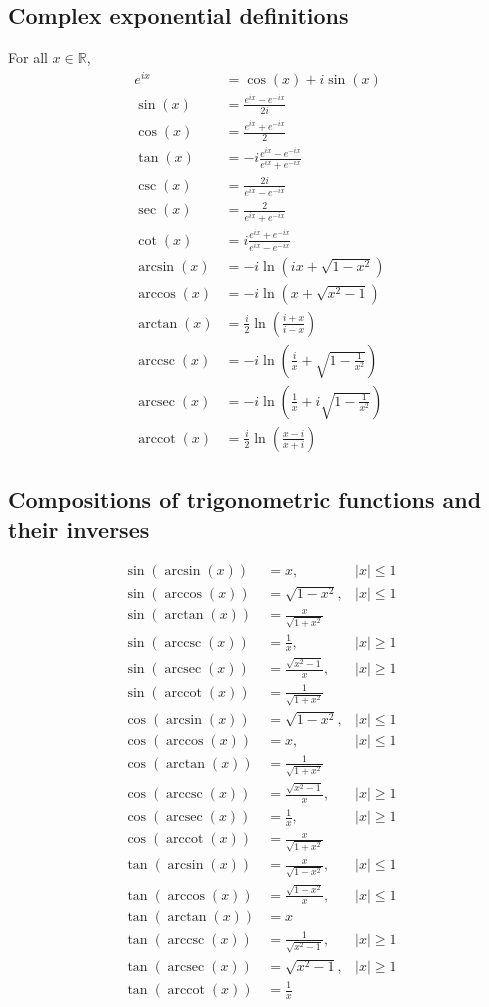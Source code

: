 \documentclass{article}
\DeclareMathOperator{\arccsc}{arccsc}
\DeclareMathOperator{\arcsec}{arcsec}
\DeclareMathOperator{\arccot}{arccot}
\begin{document}
\subsection{Complex exponential definitions}
For all $x\in\mathbb{R}$,
\begin{align}
e^{ix}&=\cos(x)+i\sin(x)\\
\sin(x)&=\frac{e^{ix}-e^{-ix}}{2i}\\
\cos(x)&=\frac{e^{ix}+e^{-ix}}{2}\\
\tan(x)&=-i\frac{e^{ix}-e^{-ix}}{e^{ix}+e^{-ix}}\\
\csc(x)&=\frac{2i}{e^{ix}-e^{-ix}}\\
\sec(x)&=\frac{2}{e^{ix}+e^{-ix}}\\
\cot(x)&=i\frac{e^{ix}+e^{-ix}}{e^{ix}-e^{-ix}}\\
\arcsin(x)&=-i\ln\left(ix+\sqrt{1-x^2}\right)\\
\arccos(x)&=-i\ln\left(x+\sqrt{x^2-1}\right)\\
\arctan(x)&=\frac{i}{2}\ln\left(\frac{i+x}{i-x}\right)\\
\arccsc(x)&=-i\ln\left(\frac{i}{x}+\sqrt{1-\frac{1}{x^2}}\right)\\
\arcsec(x)&=-i\ln\left(\frac{1}{x}+i\sqrt{1-\frac{1}{x^2}}\right)\\
\arccot(x)&=\frac{i}{2}\ln\left(\frac{x-i}{x+i}\right)
\end{align}

\subsection{Compositions of trigonometric functions and their inverses}
\begin{align}
\sin(\arcsin(x))&=x,&|x|\leq1\\
\sin(\arccos(x))&=\sqrt{1-x^2},&|x|\leq1\\
\sin(\arctan(x))&=\frac{x}{\sqrt{1+x^2}}\\
\sin(\arccsc(x))&=\frac{1}{x},&|x|\geq1\\
\sin(\arcsec(x))&=\frac{\sqrt{x^2-1}}{x},&|x|\geq1\\
\sin(\arccot(x))&=\frac{1}{\sqrt{1+x^2}}\\
\cos(\arcsin(x))&=\sqrt{1-x^2},&|x|\leq1\\
\cos(\arccos(x))&=x,&|x|\leq1\\
\cos(\arctan(x))&=\frac{1}{\sqrt{1+x^2}}\\
\cos(\arccsc(x))&=\frac{\sqrt{x^2-1}}{x},&|x|\geq1\\
\cos(\arcsec(x))&=\frac{1}{x},&|x|\geq1\\
\cos(\arccot(x))&=\frac{x}{\sqrt{1+x^2}}\\
\tan(\arcsin(x))&=\frac{x}{\sqrt{1-x^2}},&|x|\leq1\\
\tan(\arccos(x))&=\frac{\sqrt{1-x^2}}{x},&|x|\leq1\\
\tan(\arctan(x))&=x\\
\tan(\arccsc(x))&=\frac{1}{\sqrt{x^2-1}},&|x|\geq1\\
\tan(\arcsec(x))&=\sqrt{x^2-1},&|x|\geq1\\
\tan(\arccot(x))&=\frac{1}{x}
\end{align}
\end{document}
